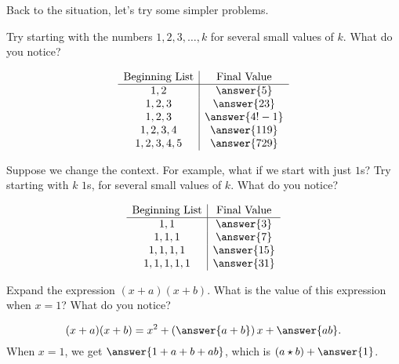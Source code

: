 \documentclass{ximera}
\begin{document}
\newpage
Back to the situation, let's try some simpler problems.  

\begin{problem}
Try starting with the numbers $1,2,3,\dots, k$ for several small values of $k$.  What do you notice?  

\[
\begin{array}{c|c}
\text{Beginning List}& \text{Final Value} \\
\hline
1,  2 & \answer{5}  \\
1,  2,  3 & \answer{23} \\  
1,  2,  3 & \answer{4! - 1} \\  
1,  2,  3 ,  4 & \answer{119} \\
1,  2,  3 ,  4 ,  5 & \answer{729} 
\end{array}
\]

\end{problem}

\begin{problem}
Suppose we change the context.  For example, what if we start with just $1$s?  Try starting with $k$ $1$s, for several small values of $k$.  What do you notice?  


\[
\begin{array}{c|c}
\text{Beginning List}& \text{Final Value} \\
\hline
1,  1 & \answer{3}  \\
1,  1,  1 & \answer{7} \\  
1,  1,  1 ,  1 & \answer{15} \\
1,  1,  1 ,  1 ,  1 & \answer{31} 
\end{array}
\]

\end{problem}

\newpage 

\begin{problem}
Expand the expression $(x+a)(x+b)$.  What is the value of this expression when $x=1$?  What do you notice?

\begin{prompt}
\[
(x+a)(x+b) = x^2+ \left(\answer{a+b}\right)x+\answer{ab}.  
\]
When $x=1$, we get $\answer{1+a+b+ab}$, which is $(a\star b)+\answer{1}$.  
\end{prompt}

\end{problem}
\end{document}
